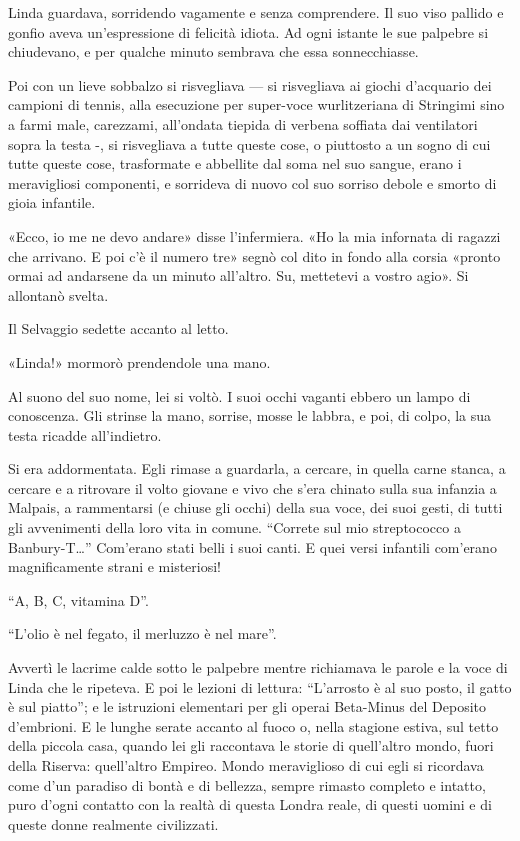 \documentclass[
a5paper, %
10pt, %
twoside, 
onecolumn, %
openany, %
]{memoir}
\begin{document}
Linda guardava, sorridendo vagamente e senza comprendere. Il suo viso pallido e gonfio aveva un’espressione di felicità idiota. Ad ogni istante le sue palpebre si chiudevano, e per qualche minuto sembrava che essa sonnecchiasse.

Poi con un lieve sobbalzo si risvegliava — si risvegliava ai giochi d’acquario dei campioni di tennis, alla esecuzione per super-voce wurlitzeriana di Stringimi sino a farmi male, carezzami, all’ondata tiepida di verbena soffiata dai ventilatori sopra la testa -, si risvegliava a tutte queste cose, o piuttosto a un sogno di cui tutte queste cose, trasformate e abbellite dal soma nel suo sangue, erano i meravigliosi componenti, e sorrideva di nuovo col suo sorriso debole e smorto di gioia infantile.

«Ecco, io me ne devo andare» disse l’infermiera. «Ho la mia infornata di ragazzi che arrivano. E poi c’è il numero tre» segnò col dito in fondo alla corsia «pronto ormai ad andarsene da un minuto all’altro. Su, mettetevi a vostro agio». Si allontanò svelta.

Il Selvaggio sedette accanto al letto.

«Linda!» mormorò prendendole una mano.

Al suono del suo nome, lei si voltò. I suoi occhi vaganti ebbero un lampo di conoscenza. Gli strinse la mano, sorrise, mosse le labbra, e poi, di colpo, la sua testa ricadde all’indietro.

Si era addormentata. Egli rimase a guardarla, a cercare, in quella carne stanca, a cercare e a ritrovare il volto giovane e vivo che s’era chinato sulla sua infanzia a Malpais, a rammentarsi (e chiuse gli occhi) della sua voce, dei suoi gesti, di tutti gli avvenimenti della loro vita in comune. “Correte sul mio streptococco a Banbury-T…” Com’erano stati belli i suoi canti. E quei versi infantili com’erano magnificamente strani e misteriosi!

“A, B, C, vitamina D”.

“L’olio è nel fegato, il merluzzo è nel mare”.

Avvertì le lacrime calde sotto le palpebre mentre richiamava le parole e la voce di Linda che le ripeteva. E poi le lezioni di lettura: “L’arrosto è al suo posto, il gatto è sul piatto”; e le istruzioni elementari per gli operai Beta-Minus del Deposito d’embrioni. E le lunghe serate accanto al fuoco o, nella stagione estiva, sul tetto della piccola casa, quando lei gli raccontava le storie di quell’altro mondo, fuori della Riserva: quell’altro Empireo. Mondo meraviglioso di cui egli si ricordava come d’un paradiso di bontà e di bellezza, sempre rimasto completo e intatto, puro d’ogni contatto con la realtà di questa Londra reale, di questi uomini e di queste donne realmente civilizzati.
\end{document}
